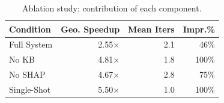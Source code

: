 \begin{table}[t]
\caption{Ablation study: contribution of each component.}
\label{tab:iterative_ablation}
\centering\small
\begin{tabular}{lrrr}
\toprule
\textbf{Condition} & \textbf{Geo. Speedup} & \textbf{Mean Iters} & \textbf{Impr.\%} \\
\midrule
Full System & 2.55$\times$ & 2.1 & 46\% \\
No KB & 4.81$\times$ & 1.8 & 100\% \\
No SHAP & 4.67$\times$ & 2.8 & 75\% \\
Single-Shot & 5.50$\times$ & 1.0 & 100\% \\
\bottomrule
\end{tabular}
\end{table}